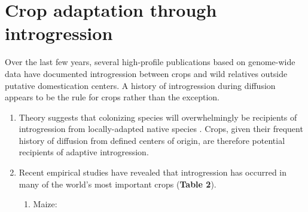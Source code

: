 \documentclass[11pt]{article}
\begin{document}
\section*{Crop adaptation through introgression}
Over the last few years, several high-profile publications based on genome-wide data have documented introgression between crops and wild relatives outside putative domestication centers.
A history of introgression during diffusion appears to be the rule for crops rather than the exception.
\begin{enumerate}
	\item{Theory suggests that colonizing species will overwhelmingly be recipients of introgression from locally-adapted native species \cite{Currat2008}. Crops, given their frequent history of diffusion from defined centers of origin, are therefore potential recipients of adaptive introgression.}
	\item{Recent empirical studies have revealed that introgression has occurred in many of the world's most important crops (\textbf{Table 2}).}
	
\begin{enumerate}
\item{Maize:}







\end{enumerate}
\end{enumerate}
\end{document}
